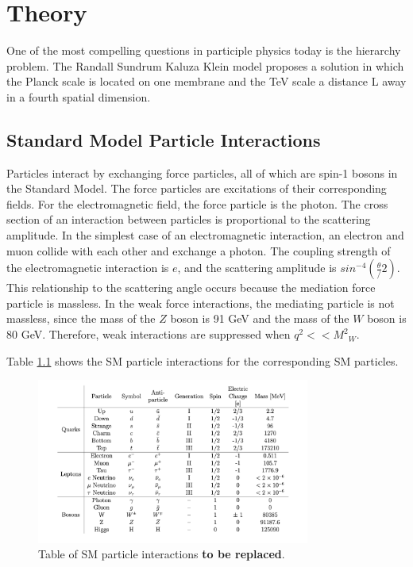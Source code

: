 \chapter{Theory}\label{chap:cms}


One of the most compelling questions in participle physics today is the hierarchy problem. The Randall Sundrum Kaluza Klein model proposes a solution in which the Planck scale is located on one membrane and the TeV scale a distance L away in a fourth spatial dimension. 


\section{Standard Model Particle Interactions}

Particles interact by exchanging force particles, all of which are spin-1 bosons in the Standard Model. The force particles are excitations of their corresponding fields. For the electromagnetic field, the force particle is the photon. The cross section of an interaction between particles is proportional to the scattering amplitude. In the simplest case of an electromagnetic interaction, an electron and muon collide with each other and exchange a photon. The coupling strength of the electromagnetic interaction is $e$, and the scattering amplitude is $sin^{-4}(\frac{\theta}/{2})$. This relationship to the scattering angle occurs because the mediation force particle is massless. In the weak force interactions, the mediating particle is not massless, since the mass of the $Z$ boson is 91 GeV and the mass of the $W$ boson is 80 GeV. Therefore, weak interactions are suppressed when $q^2 << {M^{2}}_{W}$.


Table \ref{fig:smtable} shows the SM particle interactions for the corresponding SM particles.


 \begin{figure}[h]
\centering
\includegraphics[width=0.8\textwidth]{figures/sm_table.png}
\caption{Table of SM particle interactions \textbf{to be replaced}.}
\label{fig:smtable}
\end{figure}



